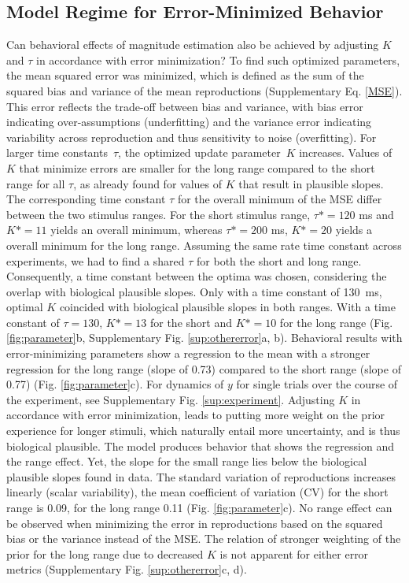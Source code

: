 \documentclass[10pt]{article}
\begin{document}
\subsection{Model Regime for Error-Minimized Behavior} %
Can behavioral effects of magnitude estimation also be achieved by adjusting $K$ and $\tau$ in accordance with error minimization?
To find such optimized parameters, the mean squared error was minimized, which is defined as the sum of the squared bias and variance of the mean reproductions (Supplementary Eq. \ref{MSE}). This error reflects the trade-off between bias and variance, with bias error indicating over-assumptions (underfitting) and the variance error indicating variability across reproduction and thus sensitivity to noise (overfitting).
For larger time constants~$\tau$, the optimized update parameter~$K$ increases. Values of $K$ that minimize errors are smaller for the long range compared to the short range for all $\tau$, as already found for values of $K$ that result in plausible slopes.
The corresponding time constant $\tau$ for the overall minimum of the MSE differ between the two stimulus ranges. For the short stimulus range, $\tau* = 120$ ms and $K* = 11$ yields an overall minimum, whereas $\tau* = 200$ ms, $K* = 20$ yields a overall minimum for the long range. 
Assuming the same rate time constant across experiments, we had to find a shared $\tau$ for both the short and long range. Consequently, a time constant between the optima was chosen, considering the overlap with biological plausible slopes. Only with a time constant of 130~ms, optimal $K$ coincided with biological plausible slopes in both ranges. 
With a time constant of $\tau = 130$, $K* = 13$ for the short and $K* = 10$ for the long range (Fig. \ref{fig:parameter}b, Supplementary Fig. \ref{sup:othererror}a, b).
Behavioral results with error-minimizing parameters show a regression to the mean with a stronger regression for the long range (slope of 0.73) compared to the short range (slope of 0.77) (Fig. \ref{fig:parameter}c). For dynamics of $y$ for single trials over the course of the experiment, see Supplementary Fig. \ref{sup:experiment}.
Adjusting $K$ in accordance with error minimization, leads to putting more weight on the prior experience for longer stimuli, which naturally entail more uncertainty, and is thus biological plausible.
The model produces behavior that shows the regression and the range effect.
Yet, the slope for the small range lies below the biological plausible slopes found in data. 
The standard variation of reproductions increases linearly (scalar variability), the mean coefficient of variation (CV) for the short range is 0.09, for the long range 0.11 (Fig. \ref{fig:parameter}c).
No range effect can be observed when minimizing the error in reproductions based on the squared bias or the variance instead of the MSE. The relation of stronger weighting of the prior for the long range due to decreased $K$ is not apparent for either error metrics (Supplementary Fig. \ref{sup:othererror}c, d).  
\end{document}
